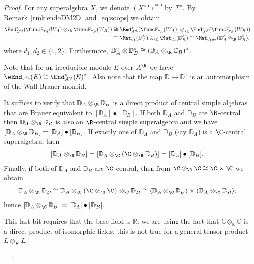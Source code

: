 \documentclass[12pt]{amsart}
\begin{document}
\begin{proof}
For any superalgebra $X$, we denote $(X^\mathrm{op})^\mathrm{sop}$ by $X^\diamond$.
By Remark~\ref{rmk:endoDM2D} and~\eqref{eq:soops}  we obtain  
\begin{align*}
\End^s_{C^\R}(\funcF_{\tau_A}(W_A)\otimes_\R \funcF_{\tau_B}(W_B))&
\cong 
\End^s_{A^\R}(\funcF_{\tau_A}(W_A))\otimes_\R^{}
\End^s_{B^\R}(\funcF_{\tau_B}(W_B))\\
&\cong
\Mat_{d_1}(\mathbb D_A^\diamond)\otimes_\R \Mat_{d_2}(\mathbb D_B^\diamond)\cong\Mat_{d_1d_2}(\mathbb D_A^\diamond\otimes_\R\mathbb D_B^\diamond),
\end{align*}
where $d_1,d_2\in\{1,2\}$. Furthermore, $\mathbb D_A^\diamond\otimes \mathbb D_B^\diamond\cong (\mathbb D_A\otimes_\R \mathbb D_B)^\diamond $. \begin{details}Note that for an irreducible module $E$ over $A^\R$ we have $\wEnd_{A^\R}(E)\cong \End_{A^\R}^s(E)^\diamond$. Also note that the map $\mathbb D\to\mathbb D^\diamond$ is an automorphism of the Wall-Brauer monoid.  
\end{details}It suffices to verify that $\mathbb D_A\otimes_\R \mathbb D_B$ is a direct product of central simple algebras that are Brauer equivalent to $[\mathbb D_A]\bullet [\mathbb D_B]$. If both $\mathbb D_A$ and $\mathbb D_B$ are $\R$-central then $\mathbb D_A\otimes_\R\mathbb D_B$ is also an $\R$-central simple superalgebra and we have $[\mathbb D_A\otimes_\R\mathbb D_B]=[\mathbb D_A]\bullet [\mathbb D_B]$. If exactly one of $\mathbb D_A$ and $\mathbb D_B$ (say $\mathbb D_A$) is a $\C$-central superalgebra, then 
\[
[\mathbb D_A\otimes_\R\mathbb D_B]= 
[\mathbb D_A\otimes_\C(\C\otimes_\R\mathbb D_B)]= [\mathbb D_A]\bullet [\mathbb D_B].
\]
Finally, if both of $\mathbb D_A$ and $\mathbb D_B$ are $\C$-central, then from $\C\otimes_\R\C\cong \C\times \C$ we obtain 
\[
\mathbb D_A\otimes_\R\mathbb D_B\cong 
\mathbb D_A\otimes_\C(\C\otimes_\R\C)\otimes_\C\mathbb D_B
\cong 
(\mathbb D_A\otimes_\C\mathbb D_B)\times 
(\mathbb D_A\otimes_\C\mathbb D_B),
\]
hence $[\mathbb D_A\otimes_\C\mathbb D_B]=[\mathbb D_A]\bullet [\mathbb D_B]$. 
\begin{details}
This last bit requires that the base field is $\mathbb R$: we are using the fact that $\mathbb C\otimes_\mathbb R\mathbb C$ is a direct product of isomorphic fields; this is not true for a general tensor product $L\otimes_K L$.  
\end{details}
\end{proof}
\end{document}
